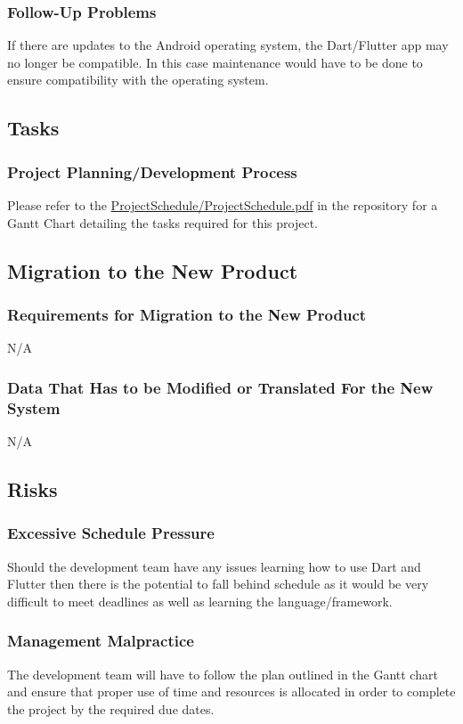 \documentclass[12pt, titlepage]{article}
\begin{document}
\subsubsection{Follow-Up Problems}
If there are updates to the Android operating system, the Dart/Flutter app may no longer be compatible. In this case maintenance would have to be done to ensure compatibility with the operating system.

\subsection{Tasks}
\subsubsection{Project Planning/Development Process}
Please refer to the \href{https://gitlab.cas.mcmaster.ca/rosnej1/open-mastermind/-/blob/master/ProjectSchedule/ProjectSchedule.pdf}{ProjectSchedule/ProjectSchedule.pdf} in the repository for a Gantt Chart detailing the tasks required for this project.

\subsection{Migration to the New Product}
\subsubsection{Requirements for Migration to the New Product}
N/A
\subsubsection{Data That Has to be Modified or Translated For the New System}
N/A

\subsection{Risks}
\subsubsection{Excessive Schedule Pressure}
Should the development team have any issues learning how to use Dart and Flutter then there is the potential to fall behind schedule as it would be very difficult to meet deadlines as well as learning the language/framework.
\subsubsection{Management Malpractice}
The development team will have to follow the plan outlined in the Gantt chart and ensure that proper use of time and resources is allocated in order to complete the project by the required due dates. 
\end{document}
